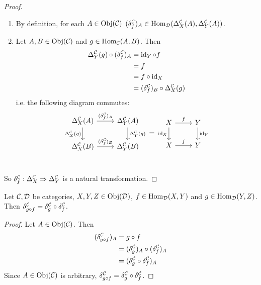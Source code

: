 \documentclass{book}
\begin{document}
	\begin{proof} \
		\begin{enumerate}
			\item By definition, for each $A \in \operatorname{Obj}(\mathcal{C})$ $(\delta^{\mathcal{C}}_f)_A \in \operatorname{Hom}_{\mathcal{D}}(\Delta^{\mathcal{C}}_X(A), \Delta^{\mathcal{C}}_Y(A))$.
			\item Let $A, B \in \operatorname{Obj}(\mathcal{C})$ and $g \in \operatorname{Hom}_{\mathcal{C}}(A, B)$. Then 
			\begin{align*}
				\Delta^{\mathcal{C}}_Y(g) \circ (\delta^{\mathcal{C}}_f)_A 
				& = \operatorname{id}_Y \circ f \\
				& = f \\
				& = f \circ \operatorname{id}_X \\
				& = (\delta^{\mathcal{C}}_f)_B \circ \Delta^{\mathcal{C}}_X(g)  
			\end{align*}
			i.e. the following diagram commutes:
			\[ 
			\begin{tikzcd}[baseline= 7]
				\Del^{\MC}_X(A)  \arrow[r, "(\del^{\MC}_f)_A"]  \arrow[d, "\Del^{\MC}_X(g)"']  & \Del^{\MC}_Y(A)   \arrow[d, "\Del^{\MC}_Y(g)"]\\
				\Del^{\MC}_X(B) \arrow[r, "(\del^{\MC}_f)_B"] &  \Del^{\MC}_Y(B) \\
			\end{tikzcd}
			=
			\begin{tikzcd}[baseline= 7]
				X  \arrow[r, "f"]  \arrow[d, "\id_X"']  & Y   \arrow[d, "\id_Y"]\\
				X \arrow[r, "f"] &  Y \\
			\end{tikzcd}
			\]
		\end{enumerate}
		So $\delta^{\mathcal{C}}_f: \Delta^{\mathcal{C}}_X \Rightarrow \Delta^{\mathcal{C}}_Y$ is a natural transformation.
	\end{proof}
	 
	\begin{ex} 
		Let $\mathcal{C}, \mathcal{D}$ be categories, $X, Y, Z \in \operatorname{Obj}(\mathcal{D})$, $f \in \operatorname{Hom}_{\mathcal{D}}(X,Y)$ and $g \in \operatorname{Hom}_{\mathcal{D}}(Y,Z)$. Then $\delta^{\mathcal{C}}_{g \circ f} = \delta^{\mathcal{C}}_g \circ \delta^{\mathcal{C}}_f$.
	\end{ex}

	\begin{proof}
		Let $A \in \operatorname{Obj}(\mathcal{C})$. Then 
		\begin{align*}
			(\delta^{\mathcal{C}}_{g \circ f})_A
			& = g \circ f \\
			& = (\delta^{\mathcal{C}}_g)_A \circ (\delta^{\mathcal{C}}_f)_A \\
			& = (\delta^{\mathcal{C}}_g \circ \delta^{\mathcal{C}}_f)_A
		\end{align*}
		Since $A \in \operatorname{Obj}(\mathcal{C})$ is arbitrary, $\delta^{\mathcal{C}}_{g \circ f} = \delta^{\mathcal{C}}_g \circ \delta^{\mathcal{C}}_f$.
	\end{proof}
\end{document}
